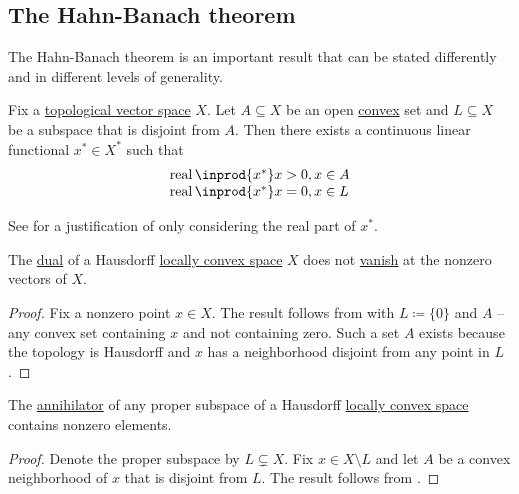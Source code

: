 \subsection{The Hahn-Banach theorem}\label{subsec:hahn_banach}

The Hahn-Banach theorem is an important result that can be stated differently and in different levels of generality.

\begin{theorem}\label{thm:geometric_hahn_banach}\mcite\cite[24]{ЙоффеТихомиров1974}
  Fix a \hyperref[def:topological_vector_space]{topological vector space} \( X \). Let \( A \subseteq X \) be an open \hyperref[def:convex_set]{convex} set and \( L \subseteq X \) be a subspace that is disjoint from \( A \). Then there exists a continuous linear functional \( x^* \in X^* \) such that
  \begin{equation*}
    \begin{array}{l}
      \real \inprod{x^*} x > 0, x \in A \\
      \real \inprod{x^*} x = 0, x \in L
    \end{array}
  \end{equation*}

  See  for a justification of only considering the real part of \( x^* \).
\end{theorem}

\begin{corollary}\label{thm:hahn_banach_implies_functionals_vanish_nowhere}\mcite\cite[24]{ЙоффеТихомиров1974}
  The \hyperref[def:dual_vector_space]{dual} of a Hausdorff \hyperref[def:locally_convex_space]{locally convex space} \( X \) does not \hyperref[def:functions_vanish_nowhere]{vanish} at the nonzero vectors of \( X \).
\end{corollary}
\begin{proof}
  Fix a nonzero point \( x \in X \). The result follows from  with \( L \coloneqq \{ 0 \} \) and \( A \) -- any convex set containing \( x \) and not containing zero. Such a set \( A \) exists because the topology is Hausdorff and \( x \) has a neighborhood disjoint from any point in \( L \).
\end{proof}

\begin{corollary}\label{thm:hahn_banach_implies_annihilator_nontrivial}\mcite\cite[25]{ЙоффеТихомиров1974}
  The \hyperref[def:vector_space_annihilator]{annihilator} of any proper subspace of a Hausdorff \hyperref[def:locally_convex_space]{locally convex space} contains nonzero elements.
\end{corollary}
\begin{proof}
  Denote the proper subspace by \( L \subsetneq X \). Fix \( x \in X \setminus L \) and let \( A \) be a convex neighborhood of \( x \) that is disjoint from \( L \). The result follows from .
\end{proof}

